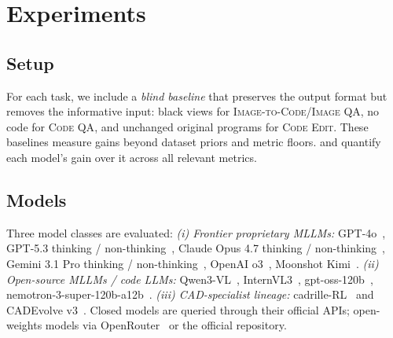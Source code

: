 \section{Experiments}
\label{sec:experiments}

\subsection{Setup}
\label{sec:exp_setup}
For each task, we include a \emph{blind baseline} that preserves the output format but removes the informative input: black views for \textsc{Image-to-Code}/\textsc{Image QA}, no code for \textsc{Code QA}, and unchanged original programs for \textsc{Code Edit}. These baselines measure gains beyond dataset priors and metric floors.
and quantify each model's gain over it across all relevant metrics.

\subsection{Models}
\label{sec:exp_models}

Three model classes are evaluated:
\emph{(i) Frontier proprietary MLLMs:} GPT-4o~\citep{OpenAI2024GPT4o}, GPT-5.3 thinking / non-thinking~\citep{OpenAI2026GPT53Instant}, Claude Opus 4.7 thinking / non-thinking~\citep{Anthropic2026Claude47}, Gemini 3.1 Pro thinking / non-thinking~\citep{Google2026Gemini31}, OpenAI o3~\citep{OpenAI2025O3O4Mini}, Moonshot Kimi~\citep{MoonshotAI2025Kimi}.
\emph{(ii) Open-source MLLMs / code LLMs:} Qwen3-VL~\citep{Bai2025Qwen3VL}, InternVL3~\citep{Chen2025InternVL3}, gpt-oss-120b~\citep{OpenAI2025GPTOSS}, nemotron-3-super-120b-a12b~\citep{NVIDIA2026Nemotron}.
\emph{(iii) CAD-specialist lineage:} cadrille-RL~\citep{Kolodiazhnyi2026} and CADEvolve v3~\citep{Elistratov2026}. Closed models are queried through their official APIs; open-weights models via OpenRouter~\citep{OpenRouter2024} or the official repository.


